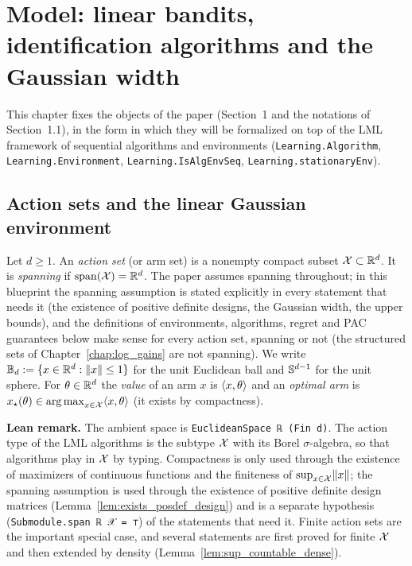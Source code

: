 \chapter{Model: linear bandits, identification algorithms and the Gaussian width}
\label{chap:model}

This chapter fixes the objects of the paper (Section~1 and the notations of Section~1.1),
in the form in which they will be formalized on top of the LML framework of sequential
algorithms and environments (\texttt{Learning.Algorithm}, \texttt{Learning.Environment},
\texttt{Learning.IsAlgEnvSeq}, \texttt{Learning.stationaryEnv}).

\section{Action sets and the linear Gaussian environment}
\label{sec:model_env}

\begin{definition}\label{def:arm_set}
\leanok
Let $d \ge 1$. An \emph{action set} (or arm set) is a nonempty compact subset $\mathcal{X} \subset \mathbb{R}^d$.
It is \emph{spanning} if $\operatorname{span}(\mathcal{X}) = \mathbb{R}^d$. The paper assumes spanning throughout; in this
blueprint the spanning assumption is stated explicitly in every statement that needs it (the
existence of positive definite designs, the Gaussian width, the upper bounds), and the
definitions of environments, algorithms, regret and PAC guarantees below make sense for every
action set, spanning or not (the structured sets of Chapter~\ref{chap:log_gains} are not
spanning). We write $\mathbb{B}_d := \{x \in \mathbb{R}^d : \lVert x \rVert \le 1\}$ for the unit
Euclidean ball and $\mathbb{S}^{d-1}$ for the unit sphere. For $\theta \in \mathbb{R}^d$ the
\emph{value} of an arm $x$ is $\langle x, \theta \rangle$ and an \emph{optimal arm} is
$x_\star(\theta) \in \operatorname*{arg\,max}_{x \in \mathcal{X}} \langle x, \theta \rangle$ (it exists by compactness).
\end{definition}

\textbf{Lean remark.} The ambient space is \texttt{EuclideanSpace ℝ (Fin d)}. The action
type of the LML algorithms is the subtype $\mathcal{X}$ with its Borel $\sigma$-algebra, so that
algorithms play in $\mathcal{X}$ by typing. Compactness is only used through the existence of
maximizers of continuous functions and the finiteness of $\sup_{x \in \mathcal{X}}\lVert x \rVert$; the
spanning assumption is used through the existence of positive definite design matrices
(Lemma~\ref{lem:exists_posdef_design}) and is a separate hypothesis
(\texttt{Submodule.span ℝ 𝒳 = ⊤}) of the statements that need it. Finite action sets are the important special case,
and several statements are first proved for finite $\mathcal{X}$ and then extended by density
(Lemma~\ref{lem:sup_countable_dense}).

